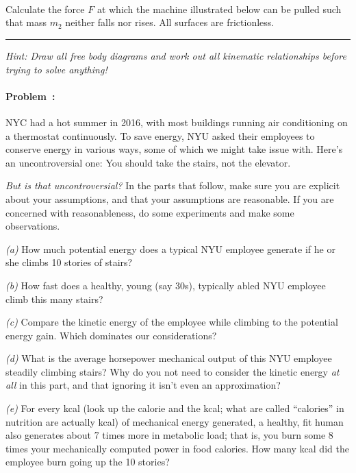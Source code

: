 \documentclass[12pt]{article}
\newcounter{problem}
\begin{document}
\paragraph{\problemname~\theproblem}

Calculate the force $F$ at which the machine illustrated below can be
pulled such that mass $m_2$ neither falls nor rises.  All surfaces are
frictionless.
\\ \rule{0.2\textwidth}{0pt}

\emph{Hint: Draw all free body diagrams and work out all kinematic
relationships before trying to solve anything!}

\paragraph{Problem~\theproblem:}%
NYC had a hot summer in 2016, with most buildings running air
conditioning on a thermostat continuously. To save energy, NYU asked
their employees to conserve energy in various ways, some of which we
might take issue with. Here's an uncontroversial one: You should take
the stairs, not the elevator.

\emph{But is that uncontroversial?}  In the parts that follow, make
sure you are explicit about your assumptions, and that your
assumptions are reasonable. If you are concerned with reasonableness,
do some experiments and make some observations.

\textsl{(a)} How much potential energy does a typical NYU employee
generate if he or she climbs 10 stories of stairs?

\textsl{(b)} How fast does a healthy, young (say 30s), typically abled
NYU employee climb this many stairs?

\textsl{(c)} Compare the kinetic energy of the employee while climbing
to the potential energy gain. Which dominates our considerations?

\textsl{(d)} What is the average horsepower mechanical output of this
NYU employee steadily climbing stairs? Why do you not need to consider
the kinetic energy \emph{at all} in this part, and that ignoring it
isn't even an approximation?

\textsl{(e)} For every kcal (look up the calorie and the kcal; what
are called ``calories'' in nutrition are actually kcal) of mechanical
energy generated, a healthy, fit human also generates about 7 times
more in metabolic load; that is, you burn some 8 times your
mechanically computed power in food calories. How many kcal did the
employee burn going up the 10 stories?
\end{document}
